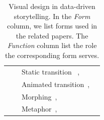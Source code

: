 \begin{table}[H]
\begin{tabular}{|l|c|l|l|}
		&                             & Static transition ~\cite{Robertson2008},           &                                                                                      \\ 
		&                             & Animated transition~\cite{Chevalier2014, Dragicevic2011, Elmqvist2008a, Guilmaine2012, Heer2007, Plaisant2002},         &                                                                                      \\ 
		&                             & Morphing~\cite{Drucker2015},                    &                                                                                      \\ 
		&                             & Metaphor~\cite{Huron2013, Lin2013, Wang2016},                    &                                                                                      \\ \hline
	\end{tabular}
\caption{Visual design in data-driven storytelling. In the \textit{Form} column, we list forms used in the related papers. The \textit{Function} column list the role the corresponding form serves.}
\label{tab:story-component}
\end{table}


